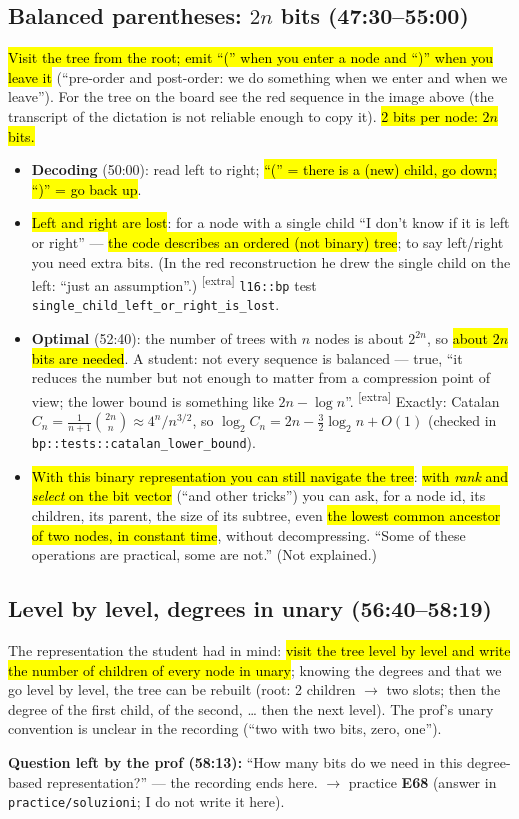 \documentclass[11pt,a4paper]{article}
\theoremstyle{definition}\newtheorem*{definition}{Definition}
\newcommand{\hly}[1]{{\sethlcolor{hlY}\hl{#1}}}
\newcommand{\hlg}[1]{{\sethlcolor{hlG}\hl{#1}}}
\newcommand{\hlp}[1]{{\sethlcolor{hlP}\hl{#1}}}
\newcommand{\hlb}[1]{{\sethlcolor{hlB}\hl{#1}}}
\newcommand{\extra}{\textsuperscript{\textcolor{warn}{[extra]}}}
\begin{document}
\subsection{Balanced parentheses: $2n$ bits (47:30--55:00)}
\hlb{Visit the tree from the root; emit ``('' when you enter a node and ``)'' when you leave it} (``pre-order and post-order: we do something when we enter and when we leave'').
For the tree on the board see the red sequence in the image above (the transcript of the dictation is not reliable enough to copy it). \hlb{2 bits per node: $2n$ bits.}
\begin{itemize}[nosep]
\item \textbf{Decoding} (50:00): read left to right; \hlb{``('' = there is a (new) child, go down; ``)'' = go back up}.
\item \hlp{Left and right are lost}: for a node with a single child ``I don't know if it is left or right'' --- \hlp{the code describes an ordered (not binary) tree}; to say left/right you need extra bits.
      (In the red reconstruction he drew the single child on the left: ``just an assumption''.) \extra{} \texttt{l16::bp} test \texttt{single\_child\_left\_or\_right\_is\_lost}.
\item \textbf{Optimal} (52:40): the number of trees with $n$ nodes is about $2^{2n}$, so \hlb{about $2n$ bits are needed}. A student: not every sequence is balanced --- true, ``it reduces the number but not enough to matter from a compression point of view; the lower bound is something like $2n-\log n$''.
      \extra{} Exactly: Catalan $C_n=\frac{1}{n+1}\binom{2n}{n}\approx 4^n/n^{3/2}$, so $\log_2 C_n=2n-\tfrac32\log_2 n+O(1)$ (checked in \texttt{bp::tests::catalan\_lower\_bound}).
\item \hlg{With this binary representation you can still navigate the tree}: \hly{with \emph{rank} and \emph{select} on the bit vector} (``and other tricks'') you can ask, for a node id, its children, its parent, the size of its subtree,
      even \hlb{the lowest common ancestor of two nodes, in constant time}, without decompressing. ``Some of these operations are practical, some are not.'' (Not explained.)
\end{itemize}

\subsection{Level by level, degrees in unary (56:40--58:19)}
The representation the student had in mind: \hlb{visit the tree level by level and write the number of children of every node in unary}; knowing the degrees and that we go level by level, the tree can be rebuilt
(root: 2 children $\to$ two slots; then the degree of the first child, of the second, \ldots{} then the next level). The prof's unary convention is unclear in the recording (``two with two bits, zero, one'').
\begin{warnbox}
\textbf{Question left by the prof (58:13):} ``How many bits do we need in this degree-based representation?'' --- the recording ends here. $\to$ practice \textbf{E68} (answer in \texttt{practice/soluzioni}; I do not write it here).
\end{warnbox}
\end{document}
